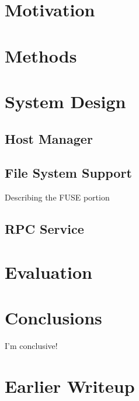 \documentclass[preprint]{sig-alternate-10pt}
\begin{document}
\section{Motivation}
    

\section{Methods}
    

\section{System Design}
    

\subsection{Host Manager}
    

\subsection{File System Support}
Describing the FUSE portion
    

\subsection{RPC Service}
    


\section{Evaluation}
    

\section{Conclusions}
I'm conclusive!
    

\section{Earlier Writeup}




%


%








\end{document}
